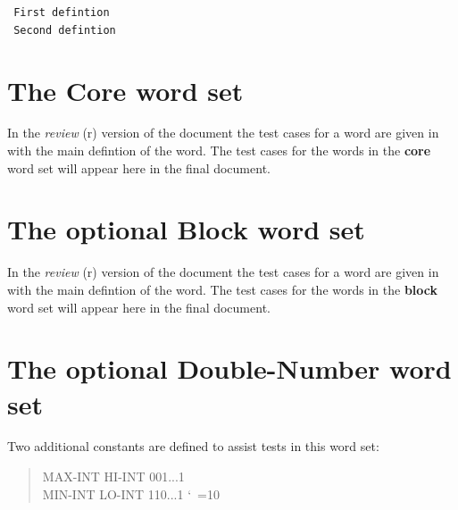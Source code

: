 	\tab \texttt{ First defintion} \\
	\tab \texttt{ Second defintion} \\


\ifinline
	\newcommand{\readtest}[1]{%
		\vspace{1ex}
		\begin{editor}
			In the \emph{review} (r) version of the document the
			test cases for a word are given in with the main
			defintion of the word.  The test cases for the words
			in the \textbf{#1} word set will appear here in the
			final document.
		\end{editor}
		\vspace{1ex}
	}

	\newcommand{\testsection}[2]{%
		\section{The optional #2 word set}
		\readtest{#1}
	}

	\newcommand{\defersection}{}
\else
	\defersection{}

	\newcommand{\readtest}[2]{%
		
	}

	\newcommand{\testsection}[2]{%
		\defersection{#2}
		\setwordlist{#1}
		
		\stepsection
	}
\fi


\setcounter{section}{5}
\section{The Core word set} %
\readtest{core}


\testsection{block}{Block}						%


\section{The optional Double-Number word set} %
\defersection{}
\label{test:double}

Two additional constants are defined to assist tests in this word set:

\begin{quote}\ttfamily\frenchspacing\obeyspaces
MAX-INT    HI-INT    001...1 \\
MIN-INT    LO-INT    110...1
\nonfrenchspacing\catcode`\ =10
\end{quote}

